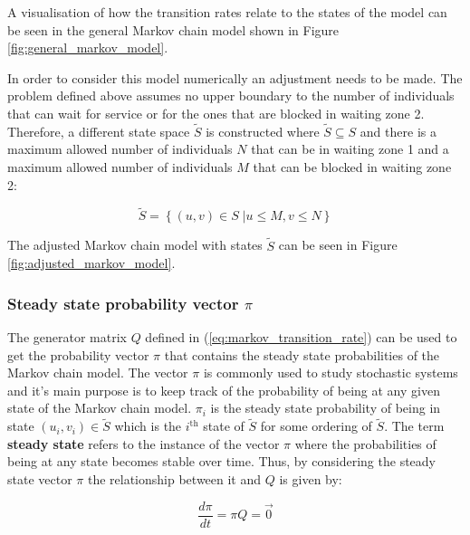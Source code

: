 A visualisation of how the transition rates relate to the states of the model
can be seen in the general Markov chain model shown in Figure
\ref{fig:general_markov_model}.




In order to consider this model numerically an adjustment needs to be made.
The problem defined above assumes no upper boundary to the number of individuals
that can wait for service or for the ones that are blocked in waiting zone 2.
Therefore, a different state space \( \tilde S \) is constructed where
\( \tilde S \subseteq S \) and there is a maximum allowed number of individuals
\(N\) that can be in waiting zone 1 and a maximum allowed number of individuals
\(M\) that can be blocked in waiting zone 2:

\begin{equation}\label{eq:truncated_state_space}
    \tilde S = \left\{ (u, v) \in S\;| u \leq M, v\leq N \right\}
\end{equation}

The adjusted Markov chain model with states \(\tilde S\) can be seen in Figure
\ref{fig:adjusted_markov_model}.





\subsubsection{Steady state probability vector \(\pi\)}

The generator matrix \( Q \) defined in (\ref{eq:markov_transition_rate}) can
be used to get the probability vector \( \pi \) that contains the steady state
probabilities of the Markov chain model.
The vector \( \pi \) is commonly used to study stochastic systems and it's main
purpose is to keep track of the probability of being at any given state of
the Markov chain model.
\(\pi_i\) is the steady state probability of being in state \((u_i, v_i) \in
\tilde S\) which is the \(i^{\text{th}}\) state of \(\tilde S\) for some
ordering of \(\tilde S\).
The term \textbf{steady state} refers to the instance of the vector \( \pi \)
where the probabilities of being at any state becomes stable over time.
Thus, by considering the steady state vector \( \pi \) the relationship between
it and \( Q \) is given by:

\begin{equation}\label{eq:steady_state_from_generator_matrix}
    \frac{d\pi}{dt} = \pi Q = \vec{0}
\end{equation}

